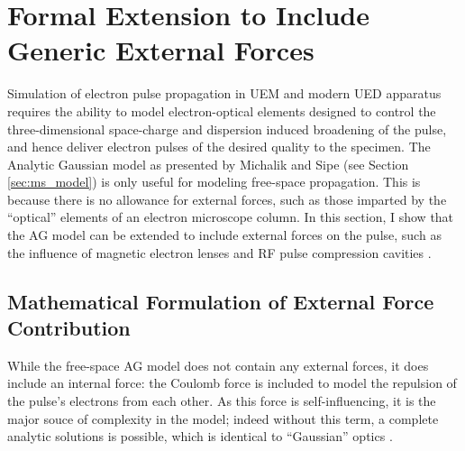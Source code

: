
\section{Formal Extension to Include Generic External Forces} \label{sec:external_forces}

Simulation of electron pulse propagation in UEM and modern UED apparatus \cite{siwick_ultrafast_2002,oudheusden_electron_2007,reed_femtosecond_2006} requires the ability to model electron-optical elements designed to control the three-dimensional space-charge and dispersion induced broadening of the pulse, and hence deliver electron pulses of the desired quality to the specimen. 
The Analytic Gaussian model as presented by Michalik and Sipe (see Section \ref{sec:ms_model}) is only useful for modeling free-space propagation.
This is because there is no allowance for external forces, such as those imparted by the ``optical'' elements of an electron microscope column.
In this section, I show that the AG model can be extended to include external forces on the pulse, such as the influence of magnetic electron lenses and RF pulse compression cavities \cite{oudheusden_electron_2007,veisz_hybrid_2007}. 

\subsection{Mathematical Formulation of External Force Contribution}

While the free-space AG model does not contain any external forces, it does include an internal force: the Coulomb force is included to model the repulsion of the pulse's electrons from each other.
As this force is self-influencing, it is the major souce of complexity in the model; indeed without this term, a complete analytic solutions is possible, which is identical to ``Gaussian'' optics \cite{michalik_analytic_2006}.

